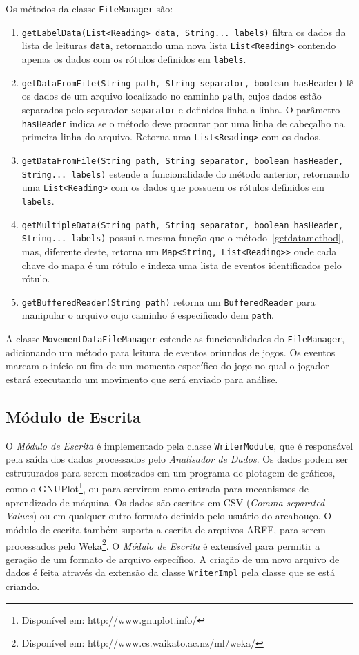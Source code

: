 Os métodos da classe \texttt{FileManager} são:
\begin{enumerate}
	\item \texttt{getLabelData(List<Reading> data, String... labels)} filtra os dados da lista de leituras \texttt{data}, retornando uma nova lista \texttt{List<Reading>} contendo apenas os dados com os rótulos definidos em \texttt{labels}.
	\item \texttt{getDataFromFile(String path, String separator, boolean hasHeader)} lê os dados de um arquivo localizado no caminho \texttt{path}, cujos dados estão separados pelo separador \texttt{separator} e definidos linha a linha. O parâmetro \texttt{hasHeader} indica se o método deve procurar por uma linha de cabeçalho na primeira linha do arquivo. Retorna uma \texttt{List<Reading>} com os dados.
	\item \label{getdatamethod} \texttt{getDataFromFile(String path, String separator, boolean hasHeader, String... labels)} estende a funcionalidade do método anterior, retornando uma \texttt{List<Reading>} com os dados que possuem os rótulos definidos em \texttt{labels}.
	\item \texttt{getMultipleData(String path, String separator, boolean hasHeader, String... labels)} possui a mesma função que o método~\ref{getdatamethod}, mas, diferente deste, retorna um \texttt{Map<String, List<Reading>>} onde cada chave do mapa é um rótulo e indexa uma lista de eventos identificados pelo rótulo.
	\item \texttt{getBufferedReader(String path)} retorna um \texttt{BufferedReader} para manipular o arquivo cujo caminho é especificado dem \texttt{path}.
\end{enumerate}

A classe \texttt{MovementDataFileManager} estende as funcionalidades do \texttt{FileManager}, adicionando um método para leitura de eventos oriundos de jogos. Os eventos marcam o início ou fim de um momento específico do jogo no qual o jogador estará executando um movimento que será enviado para análise.

\subsection{Módulo de Escrita}

O \emph{Módulo de Escrita} é implementado pela classe \texttt{WriterModule}, que é responsável pela saída dos dados processados pelo \emph{Analisador de Dados}. Os dados podem ser estruturados para serem mostrados em um programa de plotagem de gráficos, como o GNUPlot\footnote{Disponível em: http://www.gnuplot.info/}, ou para servirem como entrada para mecanismos de aprendizado de máquina. Os dados são escritos em CSV (\textit{Comma-separated Values}) ou em qualquer outro formato definido pelo usuário do arcabouço. O módulo de escrita também suporta a escrita de arquivos ARFF, para serem processados pelo Weka\footnote{Disponível em: http://www.cs.waikato.ac.nz/ml/weka/}. O \emph{Módulo de Escrita} é extensível para permitir a geração de um formato de arquivo específico. A criação de um novo arquivo de dados é feita através da extensão da classe \texttt{WriterImpl} pela classe que se está criando.

